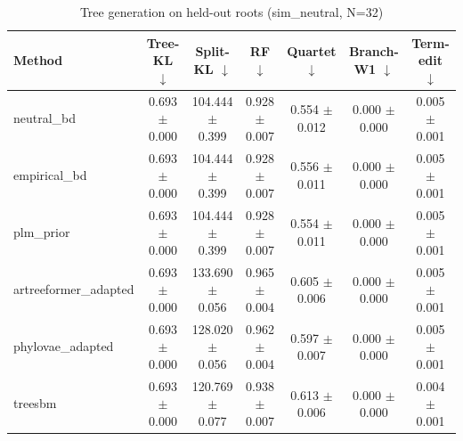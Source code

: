 \begin{table}[t]\centering
\caption{Tree generation on held-out roots (sim_neutral, N=32)}
\begin{tabular}{lcccccc}
\toprule
Method & Tree-KL $\downarrow$ & Split-KL $\downarrow$ & RF $\downarrow$ & Quartet $\downarrow$ & Branch-W1 $\downarrow$ & Term-edit $\downarrow$ \\
\midrule
neutral\_bd & 0.693 $\pm$ 0.000 & 104.444 $\pm$ 0.399 & 0.928 $\pm$ 0.007 & 0.554 $\pm$ 0.012 & 0.000 $\pm$ 0.000 & 0.005 $\pm$ 0.001 \\
empirical\_bd & 0.693 $\pm$ 0.000 & 104.444 $\pm$ 0.399 & 0.928 $\pm$ 0.007 & 0.556 $\pm$ 0.011 & 0.000 $\pm$ 0.000 & 0.005 $\pm$ 0.001 \\
plm\_prior & 0.693 $\pm$ 0.000 & 104.444 $\pm$ 0.399 & 0.928 $\pm$ 0.007 & 0.554 $\pm$ 0.011 & 0.000 $\pm$ 0.000 & 0.005 $\pm$ 0.001 \\
artreeformer\_adapted & 0.693 $\pm$ 0.000 & 133.690 $\pm$ 0.056 & 0.965 $\pm$ 0.004 & 0.605 $\pm$ 0.006 & 0.000 $\pm$ 0.000 & 0.005 $\pm$ 0.001 \\
phylovae\_adapted & 0.693 $\pm$ 0.000 & 128.020 $\pm$ 0.056 & 0.962 $\pm$ 0.004 & 0.597 $\pm$ 0.007 & 0.000 $\pm$ 0.000 & 0.005 $\pm$ 0.001 \\
treesbm & 0.693 $\pm$ 0.000 & 120.769 $\pm$ 0.077 & 0.938 $\pm$ 0.007 & 0.613 $\pm$ 0.006 & 0.000 $\pm$ 0.000 & 0.004 $\pm$ 0.001 \\
\bottomrule
\end{tabular}
\end{table}
